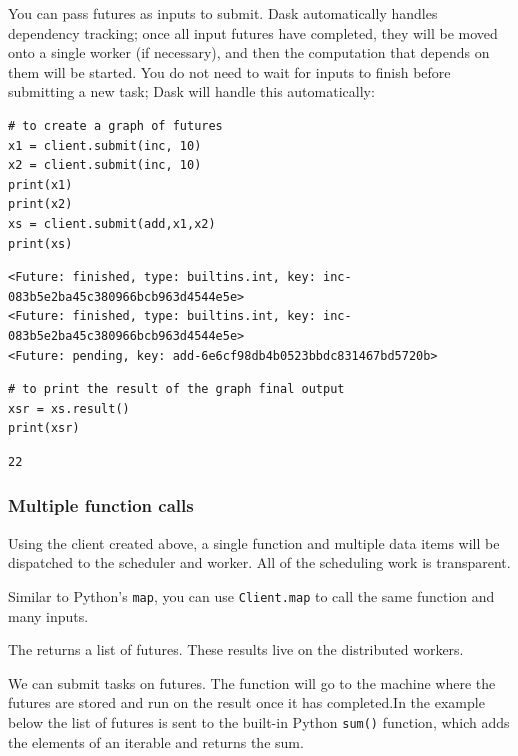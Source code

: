 You can pass futures as inputs to submit. Dask automatically handles dependency tracking; once all input futures have completed, they will be moved onto a single worker (if necessary), and then the computation that depends on them will be started. You do not need to wait for inputs to finish before submitting a new task; Dask will handle this automatically:



\begin{lstlisting}[style=incellstyle]
# to create a graph of futures
x1 = client.submit(inc, 10)
x2 = client.submit(inc, 10)
print(x1)
print(x2)
xs = client.submit(add,x1,x2)
print(xs)
\end{lstlisting}


\begin{lstlisting}[style=outcellstyle]
<Future: finished, type: builtins.int, key: inc-083b5e2ba45c380966bcb963d4544e5e>
<Future: finished, type: builtins.int, key: inc-083b5e2ba45c380966bcb963d4544e5e>
<Future: pending, key: add-6e6cf98db4b0523bbdc831467bd5720b>

\end{lstlisting}


\begin{lstlisting}[style=incellstyle]
# to print the result of the graph final output
xsr = xs.result()
print(xsr)
\end{lstlisting}


\begin{lstlisting}[style=outcellstyle]
22

\end{lstlisting}


\subsubsection{Multiple function calls}
\label{sec:Multiplefunctioncalls}

Using the client created above, a single function and multiple data items will be dispatched to the scheduler and worker. All of the scheduling work is transparent.


Similar to Python's \verb+map+, you can use \verb+Client.map+ to call the same function and many inputs.


The returns a list of futures.
These results live on the distributed workers.


We can submit tasks on futures. The function will go to the machine where the futures are stored and run on the result once it has completed.In the example below the list of futures is sent to the built-in Python \verb+sum()+ function, which adds the elements of an iterable and returns the sum.




